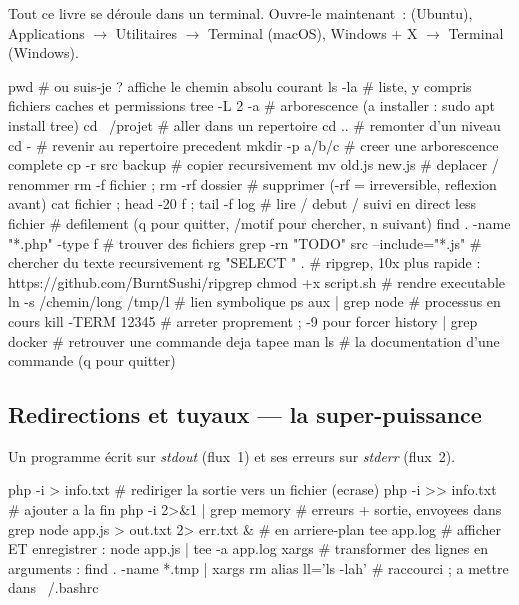 \documentclass[12pt,a4paper,twoside,openright]{book}
\DeclareRobustCommand{\clic}[1]{\textcolor{linkblue}{\textsf{#1}}}
\begin{document}
Tout ce livre se d\'eroule dans un terminal. Ouvre-le maintenant~:
 (Ubuntu), \clic{Applications $\rightarrow$ Utilitaires $\rightarrow$ Terminal} (macOS),
\clic{Windows + X $\rightarrow$ Terminal} (Windows).

\begin{terminal}
pwd                       # ou suis-je ? affiche le chemin absolu courant
ls -la                    # liste, y compris fichiers caches et permissions
tree -L 2 -a          # arborescence (a installer : sudo apt install tree)
cd ~/projet           # aller dans un repertoire
cd ..                 # remonter d'un niveau
cd -                  # revenir au repertoire precedent
mkdir -p a/b/c        # creer une arborescence complete
cp -r src backup      # copier recursivement
mv old.js new.js      # deplacer / renommer
rm -f fichier ; rm -rf dossier    # supprimer (-rf = irreversible, reflexion avant)
cat fichier ; head -20 f ; tail -f log    # lire / debut / suivi en direct
less fichier          # defilement (q pour quitter, /motif pour chercher, n suivant)
find . -name "*.php" -type f       # trouver des fichiers
grep -rn "TODO" src --include="*.js"   # chercher du texte recursivement
rg "SELECT \*" .      # ripgrep, 10x plus rapide : https://github.com/BurntSushi/ripgrep
chmod +x script.sh    # rendre executable
ln -s /chemin/long /tmp/l  # lien symbolique
ps aux | grep node    # processus en cours
kill -TERM 12345      # arreter proprement ; -9 pour forcer
history | grep docker # retrouver une commande deja tapee
man ls                # la documentation d'une commande (q pour quitter)
\end{terminal}

\subsection{Redirections et tuyaux --- la super-puissance}

Un programme \'ecrit sur \emph{stdout} (flux~1) et ses erreurs sur \emph{stderr} (flux~2).
\begin{terminal}
php -i > info.txt              # rediriger la sortie vers un fichier (ecrase)
php -i >> info.txt             # ajouter a la fin
php -i 2>&1 | grep memory       # erreurs + sortie, envoyees dans grep
node app.js > out.txt 2> err.txt &   # en arriere-plan
tee app.log                   # afficher ET enregistrer : node app.js | tee -a app.log
xargs                         # transformer des lignes en arguments : find . -name *.tmp | xargs rm
alias ll='ls -lah'            # raccourci ; a mettre dans ~/.bashrc
\end{terminal}
\end{document}
